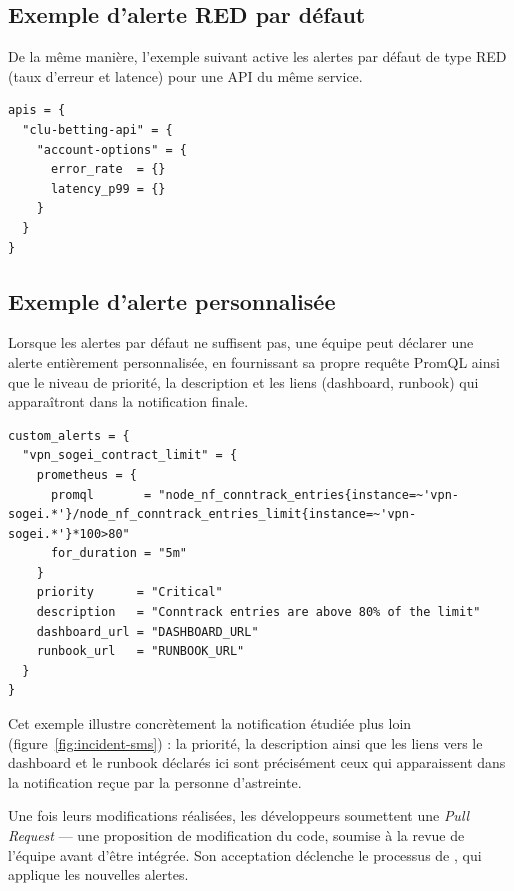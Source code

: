\subsection{Exemple d'alerte RED par défaut}

De la même manière, l'exemple suivant active les alertes par défaut de type RED (taux d'erreur et
latence) pour une API du même service.

\begin{lstlisting}[style=codestyleblack, language=HCL, caption={Activation d'alertes RED par défaut sur une API}, label={lst:red-example}]
apis = {
  "clu-betting-api" = {
    "account-options" = {
      error_rate  = {}
      latency_p99 = {}
    }
  }
}
\end{lstlisting}

\subsection{Exemple d'alerte personnalisée}

Lorsque les alertes par défaut ne suffisent pas, une équipe peut déclarer une alerte entièrement
personnalisée, en fournissant sa propre requête PromQL ainsi que le niveau de priorité, la description
et les liens (dashboard, runbook) qui apparaîtront dans la notification finale.

\begin{lstlisting}[style=codestyleblack, language=HCL, caption={Déclaration d'une alerte personnalisée en PromQL}, label={lst:custom-example}]
custom_alerts = {
  "vpn_sogei_contract_limit" = {
    prometheus = {
      promql       = "node_nf_conntrack_entries{instance=~'vpn-sogei.*'}/node_nf_conntrack_entries_limit{instance=~'vpn-sogei.*'}*100>80"
      for_duration = "5m"
    }
    priority      = "Critical"
    description   = "Conntrack entries are above 80% of the limit"
    dashboard_url = "DASHBOARD_URL"
    runbook_url   = "RUNBOOK_URL"
  }
}
\end{lstlisting}

Cet exemple illustre concrètement la notification étudiée plus loin (figure~\ref{fig:incident-sms}) : la
priorité, la description ainsi que les liens vers le dashboard et le runbook déclarés ici sont précisément
ceux qui apparaissent dans la notification reçue par la personne d'astreinte.

Une fois leurs modifications réalisées, les développeurs soumettent une \emph{Pull Request} — une
proposition de modification du code, soumise à la revue de l'équipe avant d'être intégrée. Son
acceptation déclenche le processus de , qui applique les nouvelles alertes.

